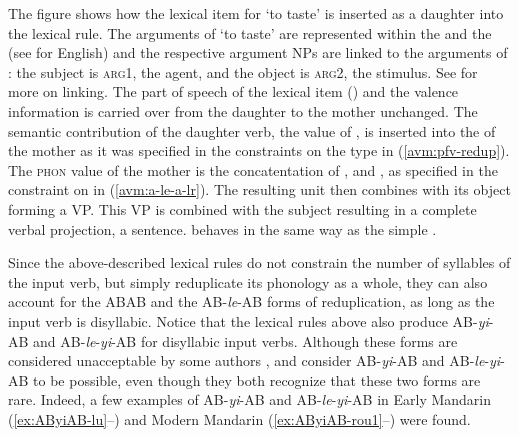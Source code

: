 The figure shows how the lexical item for  `to taste' is inserted as a daughter into
the  lexical rule. The arguments of  `to taste' are represented within the \spr and
the \compsl (see \citealt{GSag2000a-u} for English) and the respective argument NPs are linked to the
arguments of : the subject is \textsc{arg1}, the agent, and the object is \textsc{arg2},
the stimulus. See \citet{DKW2021a} for more on linking. The part of speech of the lexical item
() and the valence information is carried over from the daughter to the mother
unchanged. The semantic contribution of the daughter verb, the value of , is inserted into
the \relsl of the mother as it was specified in the constraints on the type
 in (\ref{avm:pfv-redup}). The \textsc{phon} value of the mother
is the concatentation of ,  and , as specified in the constraint
on  in (\ref{avm:a-le-a-lr}). The resulting unit  then
combines with its object forming a VP. This VP is combined with the subject resulting in a complete
verbal projection, a sentence.  behaves in the same way as the simple .

Since the above-described lexical rules do not constrain the number of syllables of the input verb, but simply reduplicate its phonology  as a whole,
they can also account for the ABAB and the AB-\textit{le}-AB forms of reduplication,
as long as the input verb is disyllabic.
Notice that  the lexical rules above also produce AB-\textit{yi}-AB and AB\hyp{}\textit{le}\hyp{}\textit{yi}\hyp{}AB for disyllabic input verbs.
Although these forms are considered unacceptable by some authors \citetext{\citealp[30]{LiThompson1981}; \citealp[275--276]{Hong1999};  \citealp[160]{BascianoMelloni2017}; \citealp[239]{YangWei2017}}, 
\citet[269]{Fan1964} and \citet[143]{Sui2018} consider AB-\textit{yi}-AB and AB-\textit{le}-\textit{yi}-AB to be possible, even though they both recognize that these two forms are rare.
Indeed, a few examples of AB\hyp{}\emph{yi}\hyp{}AB and AB\hyp{}\emph{le}\hyp{}\emph{yi}\hyp{}AB in Early Mandarin %
 (\ref{ex:AByiAB-lu}--) and Modern Mandarin (\ref{ex:AByiAB-rou1}--) were found.

\settowidth{}

